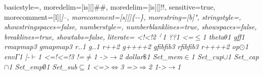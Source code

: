  {
	basicstyle=\ttfamily\codesize,
	moredelim=[is][\showfocus]{\#}{\#},
	moredelim=[is][\showlogic]{!}{!},
	sensitive=true,
	morecomment=[l][\ttfamily\itshape\codesize]{--},
	morecomment=[s][\ttfamily\itshape\codesize]{\{-}{-\}},
	morestring=[b]",
	stringstyle=\color{haskellstr},
	showstringspaces=false,
	numberstyle=\codesize,
	numberblanklines=true,
	showspaces=false,
	breaklines=true,
	showtabs=false,
  literate={
	         {<!}{{{\color{lcolor}<!}}}2
           {`}{{{$^{\backprime}{}$}}}1
           {?}{{{\color{lcolor}?}}}1
           {<=}{{$\leq$}}1
           {theta}{{$\theta$}}1
           {gf}{{{\color{lappascolor}f}}}1
           {rmap}{{{\color{lappcolor}map}}}3
           {gmap}{{{\color{lappascolor}map}}}3
           {r.}{{{\color{lappcolor}.}}}1
           {g.}{{{\color{lappascolor}.}}}1
           {r++}{{{\showfocus{++}}}}2
           {g++}{{{\color{lappascolor}++}}}2
           {gfib}{{{\color{lappascolor}fib}}}3
           {rfib}{{{\color{lappcolor}fib}}}3
           {r++}{{{\color{lappcolor}++}}}2
           {op}{{$\odot$}}1
           {env}{{$\Gamma$}}1
           {|-}{{$\vdash$}}1
           {<=!}{{{\color{lcolor}<=!}}}3
           {!=}{{$\neq$}}1
           {->}{{$\rightarrow$}}2
           {dollar}{{$\texttt{\$}$}}1
           {Set_mem}{{$\in$}}1
           {Set_cup}{{$\cup$}}1
           {Set_cap}{{$\cap$}}1
           {Set_emp}{{$\emptyset$}}1
           {Set_sub}{{$\subseteq$}}1
           {<=>}{{$\Leftrightarrow$}}3
           {=>}{{$\Rightarrow$}}2
           {1->}{{$\rightarrow$}}1
}}
